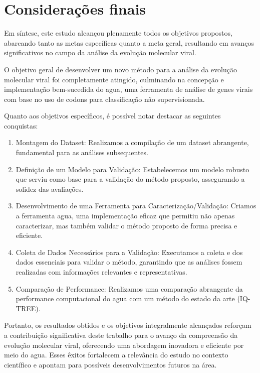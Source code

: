 \chapter{Considerações finais}

Em síntese, este estudo alcançou plenamente todos os objetivos propostos, abarcando tanto as metas específicas quanto a meta geral, resultando em avanços significativos no campo da análise da evolução molecular viral.

O objetivo geral de desenvolver um novo método para a análise da evolução molecular viral foi completamente atingido, culminando na concepção e implementação bem-sucedida do \gls{agua}, uma ferramenta de análise de genes virais com base no uso de codons para classificação não supervisionada.

Quanto aos objetivos específicos, é possível notar destacar as seguintes conquistas:

\begin{enumerate}[label=~(\roman*)]
  \item Montagem do Dataset: Realizamos a compilação de um dataset abrangente, fundamental para as análises subsequentes.
  \item Definição de um Modelo para Validação: Estabelecemos um modelo robusto que serviu como base para a validação do método proposto, assegurando a solidez das avaliações.
  \item Desenvolvimento de uma Ferramenta para Caracterização/Validação: Criamos a ferramenta \gls{agua}, uma implementação eficaz que permitiu não apenas caracterizar, mas também validar o método proposto de forma precisa e eficiente.
  \item Coleta de Dados Necessários para a Validação: Executamos a coleta e dos dados essenciais para validar o método, garantindo que as análises fossem realizadas com informações relevantes e representativas.
  \item Comparação de Performance: Realizamos uma comparação abrangente da performance computacional do \gls{agua} com um método do estado da arte (IQ-TREE).
\end{enumerate}

Portanto, os resultados obtidos e os objetivos integralmente alcançados reforçam a contribuição significativa deste trabalho para o avanço da compreensão da evolução molecular viral, oferecendo uma abordagem inovadora e eficiente por meio do \gls{agua}. Esses êxitos fortalecem a relevância do estudo no contexto científico e apontam para possíveis desenvolvimentos futuros na área.


